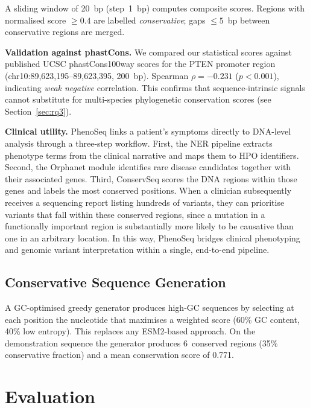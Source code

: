 \documentclass[11pt,a4paper]{article}
\begin{document}
A sliding window of 20~bp (step~1~bp) computes composite scores.  Regions with
normalised score $\geq 0.4$ are labelled \emph{conservative}; gaps $\leq 5$~bp
between conservative regions are merged.

\textbf{Validation against phastCons.}  We compared our statistical scores
against published UCSC phastCons100way scores for the PTEN promoter region
(chr10:89{,}623{,}195--89{,}623{,}395, 200~bp).  Spearman
$\rho = -0.231$ ($p < 0.001$), indicating \emph{weak negative} correlation.
This confirms that sequence-intrinsic signals cannot substitute for
multi-species phylogenetic conservation scores (see Section~\ref{sec:rq3}).

\textbf{Clinical utility.}
PhenoSeq links a patient's symptoms directly to DNA-level analysis through a
three-step workflow.  First, the NER pipeline extracts phenotype terms from the
clinical narrative and maps them to HPO identifiers.  Second, the Orphanet
module identifies rare disease candidates together with their associated genes.
Third, ConservSeq scores the DNA regions within those genes and labels the most
conserved positions.  When a clinician subsequently receives a sequencing report
listing hundreds of variants, they can prioritise variants that fall within
these conserved regions, since a mutation in a functionally important region is
substantially more likely to be causative than one in an arbitrary location.
In this way, PhenoSeq bridges clinical phenotyping and genomic variant
interpretation within a single, end-to-end pipeline.

\subsection{Conservative Sequence Generation}

A GC-optimised greedy generator produces high-GC sequences by selecting at each
position the nucleotide that maximises a weighted score (60\% GC content,
40\% low entropy).  This replaces any ESM2-based approach.  On the demonstration
sequence the generator produces 6~conserved regions (35\% conservative fraction)
and a mean conservation score of 0.771.

\section{Evaluation}
\end{document}
